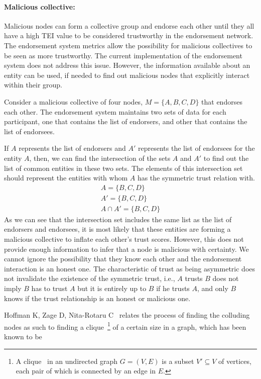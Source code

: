 \paragraph{Malicious collective:}Malicious nodes can form a collective group
and endorse each other until they all have a high \ac{TEI} value to be
considered trustworthy in the endorsement network. The endorsement system
metrics allow the possibility for malicious collectives to be seen as more
trustworthy. The current implementation of the endorsement system does not
address this issue. However, the information available about an entity can be
used, if needed to find out malicious nodes that explicitly interact within
their group. \par
Consider a malicious collective of four nodes, $M = \{A,B,C,D\}$ that endorses
each other. The endorsement system maintains two sets of data for each
participant, one that contains the list of endorsers, and other that contains
the list of endorsees. \par
If $A$ represents the list of endorsers and $A'$ represents the list of
endorsees for the entity $A$, then, we can find the intersection of the sets
$A$ and $A'$ to find out the list of common entities in these two sets. The
elements of this intersection set should represent the entities with whom $A$
has the symmetric trust relation with.  
\begin{equation}
	\begin{split}
	A= \{B,C,D\} \\
	A' = \{B,C,D\} \\
	A \cap A' = \{B,C,D\}
\end{split}
\end{equation}
As we can see that the intersection set includes the same list as the list of
endorsers and endorsees, it is most likely that these entities are forming a
malicious collective to inflate each other's trust scores. However, this does
not provide enough information to infer that a node is malicious with
certainty. We cannot ignore the possibility that they know each other and the
endorsement interaction is an honest one. The characteristic of trust as being
asymmetric does not invalidate the existence of the symmetric trust, i.e., $A$
trusts $B$ does not imply $B$ has to trust $A$ but it is entirely up to $B$ if
he trusts $A$, and only $B$ knows if the trust relationship is an honest or
malicious one. \par
Hoffman K, Zage D, Nita-Rotaru C~\cite{hoffman2009survey} relates the process
of finding the colluding nodes as such to finding a clique~\footnote{A
clique~\cite{cormen2009introduction} in an undirected graph $G = ( V,E)$ is a
subset $V' \subseteq V$ of vertices, each pair of which is connected by an
edge in $E$.} of a certain size in a graph, which has been known to be
